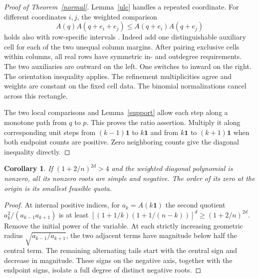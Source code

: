 \documentclass[11pt]{article}
\newtheorem{corollary}[theorem]{Corollary}
\newcommand{\bone}{\mathbf{1}}
\begin{document}
\begin{proof}[Proof of Theorem~\ref{normal}]
Lemma~\ref{ulc} handles a repeated coordinate. For different coordinates $i,j$, the weighted comparison
\[
 A(q)A(q+e_i+e_j)\le A(q+e_i)A(q+e_j)
\]
holds also with row-specific intervals \cite{repo}. Indeed add one distinguishable auxiliary cell for each of the two unequal column margins. After pairing exclusive cells within columns, all real rows have symmetric in- and outdegree requirements. The two auxiliaries are outward on the left. One switches to inward on the right. The orientation inequality \cite[Lemma~8]{urns} applies. The refinement multiplicities agree and weights are constant on the fixed cell data. The binomial normalizations cancel across this rectangle.

The two local comparisons and Lemma~\ref{support} allow each step along a monotone path from $q$ to $p$. This proves the ratio assertion. Multiply it along corresponding unit steps from $(k-1)\bone$ to $k\bone$ and from $k\bone$ to $(k+1)\bone$ when both endpoint counts are positive. Zero neighboring counts give the diagonal inequality directly.
\end{proof}

\begin{corollary}
If $(1+2/n)^{2d}>4$ and the weighted diagonal polynomial is nonzero, all its nonzero roots are simple and negative. The order of its zero at the origin is its smallest feasible quota.
\end{corollary}
\begin{proof}
At internal positive indices, for $a_k=A(k\bone)$ the second quotient $a_k^2/(a_{k-1}a_{k+1})$ is at least $[(1+1/k)(1+1/(n-k))]^d\ge(1+2/n)^{2d}$. Remove the initial power of the variable. At each strictly increasing geometric radius $\sqrt{a_{k-1}/a_{k+1}}$, the two adjacent terms have magnitude below half the central term. The remaining alternating tails start with the central sign and decrease in magnitude. These signs on the negative axis, together with the endpoint signs, isolate a full degree of distinct negative roots.
\end{proof}
\end{document}

